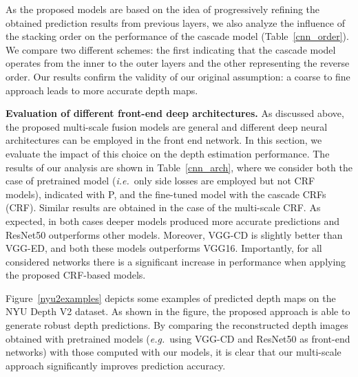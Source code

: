 \documentclass[10pt,twocolumn,letterpaper]{article}
\def\eg{\textit{e.g.}~}
\def\ie{\textit{i.e.}~}
\begin{document}
As the proposed models are based on the idea of progressively refining the obtained prediction results from previous layers, we 
also analyze the influence of the stacking order on the performance of the cascade model (Table~\ref{cnn_order}). We compare two different schemes: 
the first indicating that the cascade model operates from the inner to the outer layers and the other representing the reverse order.
Our results confirm the validity of our original assumption: a coarse to fine approach leads to 
more accurate depth maps. 


\textbf{Evaluation of different front-end deep architectures.} As discussed above, the proposed multi-scale fusion models are
general and different deep neural architectures can be employed in the front end network. In this section,
we evaluate the impact of this choice on the depth estimation performance. The results of our analysis are shown in
Table~\ref{cnn_arch}, where we consider both the case of pretrained model (\ie only side losses are employed but not CRF models), indicated with P,
and the fine-tuned model with the cascade CRFs (CRF). Similar results
are obtained in the case of the multi-scale CRF. As expected, in both cases deeper models produced more accurate predictions and ResNet50 outperforms other models. Moreover, VGG-CD is slightly better than VGG-ED, and both these models outperforms VGG16.
Importantly, for all considered networks there is a significant increase in performance when applying the proposed CRF-based models.

Figure~\ref{nyu2examples} depicts some examples of predicted depth maps on the NYU Depth V2 dataset. As shown in the figure, the proposed approach 
is able to generate robust depth predictions. By comparing the reconstructed depth images
obtained with pretrained models (\eg using VGG-CD and ResNet50 as front-end networks) with those computed with our 
models, it is clear that our multi-scale approach significantly improves prediction accuracy.
\end{document}

